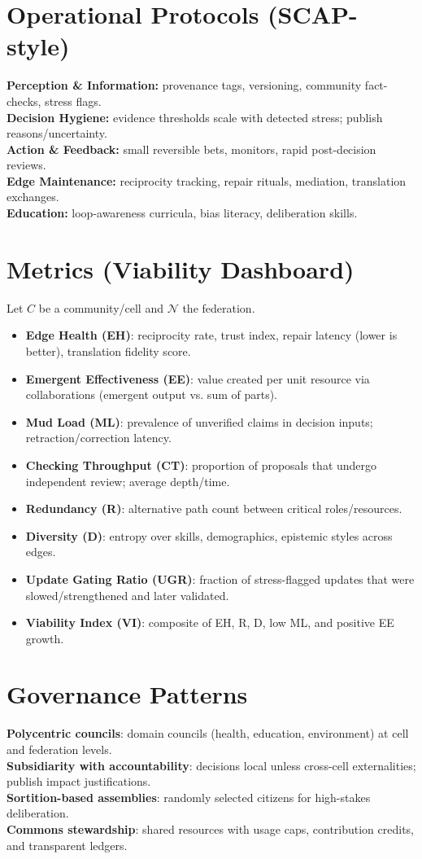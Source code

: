 \documentclass[11pt,a4paper]{article}
\begin{document}
\section{Operational Protocols (SCAP-style)}
\textbf{Perception \& Information:} provenance tags, versioning, community fact-checks, stress flags.\\
\textbf{Decision Hygiene:} evidence thresholds scale with detected stress; publish reasons/uncertainty.\\
\textbf{Action \& Feedback:} small reversible bets, monitors, rapid post-decision reviews.\\
\textbf{Edge Maintenance:} reciprocity tracking, repair rituals, mediation, translation exchanges.\\
\textbf{Education:} loop-awareness curricula, bias literacy, deliberation skills.

\section{Metrics (Viability Dashboard)}
Let $C$ be a community/cell and $\mathcal{N}$ the federation.
\begin{itemize}
  \item \textbf{Edge Health (EH)}: reciprocity rate, trust index, repair latency (lower is better), translation fidelity score.
  \item \textbf{Emergent Effectiveness (EE)}: value created per unit resource via collaborations (emergent output vs. sum of parts).
  \item \textbf{Mud Load (ML)}: prevalence of unverified claims in decision inputs; retraction/correction latency.
  \item \textbf{Checking Throughput (CT)}: proportion of proposals that undergo independent review; average depth/time.
  \item \textbf{Redundancy (R)}: alternative path count between critical roles/resources.
  \item \textbf{Diversity (D)}: entropy over skills, demographics, epistemic styles across edges.
  \item \textbf{Update Gating Ratio (UGR)}: fraction of stress-flagged updates that were slowed/strengthened and later validated.
  \item \textbf{Viability Index (VI)}: composite of EH, R, D, low ML, and positive EE growth.
\end{itemize}

\section{Governance Patterns}
\textbf{Polycentric councils}: domain councils (health, education, environment) at cell and federation levels.\\
\textbf{Subsidiarity with accountability}: decisions local unless cross-cell externalities; publish impact justifications.\\
\textbf{Sortition-based assemblies}: randomly selected citizens for high-stakes deliberation.\\
\textbf{Commons stewardship}: shared resources with usage caps, contribution credits, and transparent ledgers.
\end{document}
